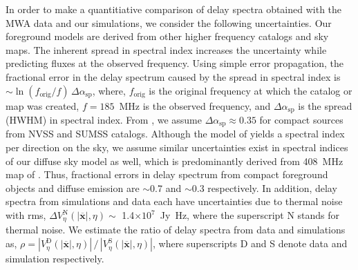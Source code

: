 \documentclass[preprint2,iop,numberedappendix]{emulateapj}
\begin{document}
In order to make a quantitiative comparison of delay spectra obtained with the MWA data and our simulations, we consider the following uncertainties. Our foreground models are derived from other higher frequency catalogs and sky maps. The inherent spread in spectral index increases the uncertainty while predicting fluxes at the observed frequency. Using simple error propagation, the fractional error in the delay spectrum caused by the spread in spectral index is $\sim \ln(f_\textrm{orig}/f)\,\Delta\alpha_\textrm{sp}$, where, $f_\textrm{orig}$ is the original frequency at which the catalog or map was created, $f=185$~MHz is the observed frequency, and $\Delta\alpha_\textrm{sp}$ is the spread (HWHM) in spectral index. From \citet{mau03}, we assume $\Delta\alpha_\textrm{sp} \approx 0.35$ for compact sources from NVSS and SUMSS catalogs. Although the model of \citet{deo08} yields a spectral index per direction on the sky, we assume similar uncertainties exist in spectral indices of our diffuse sky model as well, which is predominantly derived from 408~MHz map of \citet{has82}. Thus, fractional errors in delay spectrum from compact foreground objects and diffuse emission are $\sim$0.7 and $\sim$0.3 respectively. In addition, delay spectra from simulations and data each have uncertainties due to thermal noise with rms, $\Delta V^\textrm{N}_\eta(|\overline{\mathbf{x}}|,\eta) \sim$ 1.4$\times 10^7$~Jy~Hz, where the superscript N stands for thermal noise. We estimate the ratio of delay spectra from data and simulations as, $\rho = |V^\textrm{D}_\eta(|\overline{\mathbf{x}}|,\eta)|\,/\,|V^\textrm{S}_\eta(|\overline{\mathbf{x}}|,\eta)|$, where superscripts D and S denote data and simulation respectively. %

\end{document}
